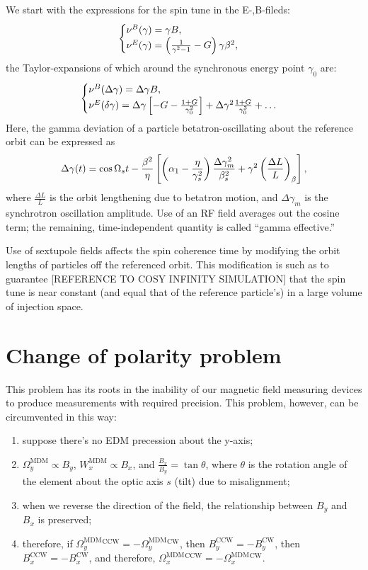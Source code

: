 \documentclass{article}
\newcommand{\W}{\Omega}
\newcommand{\MDM}{^\mathrm{MDM}}
\newcommand{\CW}{^\mathrm{CW}}
\newcommand{\CCW}{^\mathrm{CCW}}
\begin{document}
We start with the expressions for the spin tune in the E-,B-fileds:
\begin{equation}\label{eq:spin_tune}
  \begin{cases}
    \nu^B(\gamma) = \gamma B,\\
    \nu^E(\gamma) = \bkt{\frac{1}{\gamma^2-1}-G}\gamma\beta^2,
  \end{cases}
\end{equation}
the Taylor-expansions of which around the synchronous energy point $\gamma_0$ are:
\begin{equation}
  \begin{cases}
    \nu^B(\Delta\gamma) = \Delta\gamma B,\\
    \nu^E(\delta\gamma) = \Delta\gamma\bkt*{-G - \frac{1+G}{\gamma_0^2}} + \Delta\gamma^2\frac{1+G}{\gamma_0^3} + \dots
  \end{cases}
\end{equation}
Here, the gamma deviation of a particle betatron-oscillating about the reference orbit can be expressed as
\begin{equation}\label{eq:delta_gamma}
  \Delta\gamma(t) = \cos\Omega_s t - \frac{\beta^2}{\eta}\bkt*{\bkt{\alpha_1 - \frac{\eta}{\gamma_s^2}}\frac{\Delta\gamma_m^2}{\beta_s^2} + \gamma^2\bkt{\frac{\Delta L}{L}}_\beta},
\end{equation}
where $\frac{\Delta L}{L}$ is the orbit lengthening due to betatron motion, and $\Delta\gamma_m$ is the synchrotron oscillation amplitude. Use of an RF field averages out the cosine term; the remaining, time-independent quantity is called ``gamma effective.''

Use of sextupole fields affects the spin coherence time by modifying the orbit lengths of particles off the referenced orbit. This modification is such as to guarantee [REFERENCE TO COSY INFINITY SIMULATION] that the spin tune is near constant (and equal that of the reference particle's) in a large volume of injection space.

\section{Change of polarity problem}
This problem has its roots in the inability of our magnetic field measuring devices to produce measurements with required precision. This problem, however, can be circumvented in this way:
\begin{enumerate}
\item suppose there's no EDM precession about the y-axis;
\item $\W_y\MDM\propto B_y$, $W_x\MDM\propto B_x$, and $\frac{B_x}{B_y} = \tan\theta$, where $\theta$ is the rotation angle of the element about the optic axis $s$ (tilt) due to misalignment;
\item when we reverse the direction of the field, the relationship between $B_y$ and $B_x$ is preserved;
\item therefore, if $\W_y\MDM\CCW = -\W_y\MDM\CW$, then $B_y\CCW = -B_y\CW$, then $B_x\CCW = -B_x\CW$, and therefore, $\W_x\MDM\CCW = -\W_x\MDM\CW$.
\end{enumerate}
\end{document}
